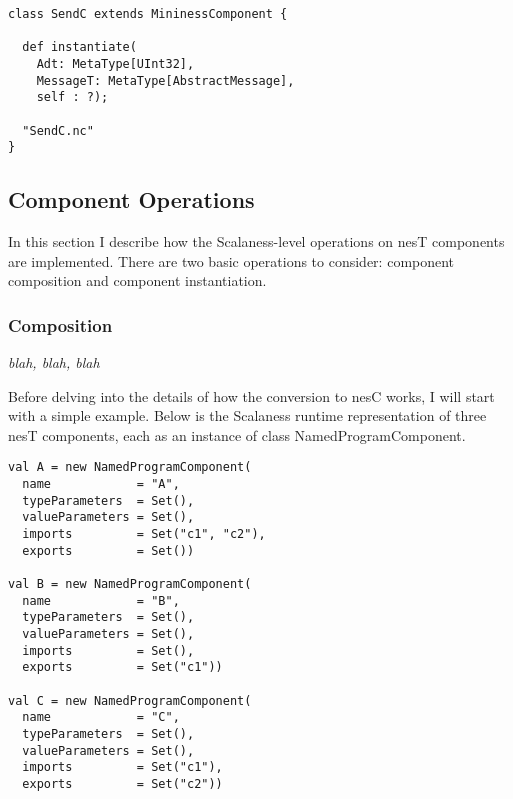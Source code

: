 \singlespace
\begin{lstlisting}[language=scalaness]
class SendC extends MininessComponent {

  def instantiate(
    Adt: MetaType[UInt32],
    MessageT: MetaType[AbstractMessage],
    self : ?);

  "SendC.nc"
}
\end{lstlisting}
\primaryspacing



\subsection{Component Operations}
\label{section-component-operations}


In this section I describe how the Scalaness-level operations on nesT components are
implemented. There are two basic operations to consider: component composition and component
instantiation.

\subsubsection{Composition}
\label{section-composition}

\textit{blah, blah, blah}

Before delving into the details of how the conversion to nesC works, I will start with a simple
example. Below is the Scalaness runtime representation of three nesT components, each as an
instance of class NamedProgramComponent.

\singlespace
\begin{lstlisting}[language=scalaness]
val A = new NamedProgramComponent(
  name            = "A",
  typeParameters  = Set(),
  valueParameters = Set(),
  imports         = Set("c1", "c2"),
  exports         = Set())

val B = new NamedProgramComponent(
  name            = "B",
  typeParameters  = Set(),
  valueParameters = Set(),
  imports         = Set(),
  exports         = Set("c1"))

val C = new NamedProgramComponent(
  name            = "C",
  typeParameters  = Set(),
  valueParameters = Set(),
  imports         = Set("c1"),
  exports         = Set("c2"))
\end{lstlisting}
\primaryspacing

